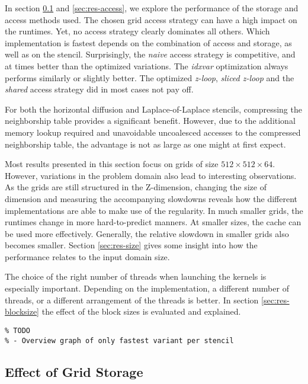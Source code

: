 In section \ref{sec:res-storage} and \ref{sec:res-access}, we explore the performance of the storage and access methods used. The chosen grid access strategy can have a high impact on the runtimes. Yet, no access strategy clearly dominates all others. Which implementation is fastest depends on the combination of access and storage, as well as on the stencil. Surprisingly, the \emph{naive} access strategy is competitive, and at times better than the optimized variations. The \emph{idxvar} optimization always performs similarly or slightly better. The optimized \emph{z-loop}, \emph{sliced z-loop} and the \emph{shared} access strategy did in most cases not pay off.

For both the horizontal diffusion and Laplace-of-Laplace stencils, compressing the neighborship table provides a significant benefit. However, due to the additional memory lookup required and unavoidable uncoalesced accesses to the compressed neighborship table, the advantage is not as large as one might at first expect.

Most results presented in this section focus on grids of size $512\times 512\times 64$. However, variations in the problem domain also lead to interesting observations. As the grids are still structured in the Z-dimension, changing the size of dimension and measuring the accompanying slowdowns reveals how the different implementations are able to make use of the regularity. In much smaller grids, the runtimes change in more hard-to-predict manners. At smaller sizes, the cache can be used more effectively. Generally, the relative slowdown in smaller grids also becomes smaller. Section \ref{sec:res-size} gives some insight into how the performance relates to the input domain size.

The choice of the right number of threads when launching the kernels is especially important. Depending on the implementation, a different number of threads, or a different arrangement of the threads is better. In section \ref{sec:res-blocksize} the effect of the block sizes is evaluated and explained.

\begin{verbatim}
% TODO 
% - Overview graph of only fastest variant per stencil
\end{verbatim}

\subsection{Effect of Grid Storage} \label{sec:res-storage}

